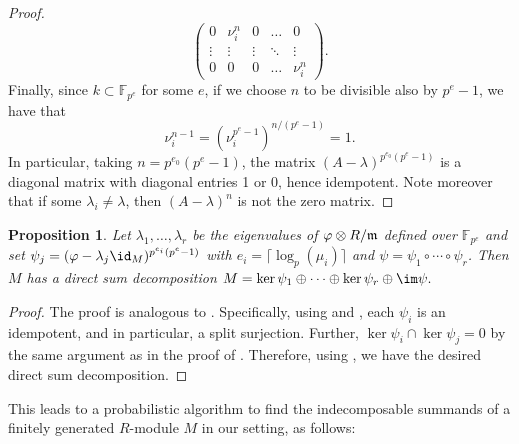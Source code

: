 \documentclass[12pt]{article}
\def\FF{\mathbb F}
\theoremstyle{theorem}
\numberwithin{thm}{section}
\newtheorem{prop}[thm]{Proposition}
\theoremstyle{definition}
\begin{document}
\begin{proof}
\[\begin{pmatrix}
    0 & \nu_i^n & 0 & \dots & 0 \\
    \vdots & \vdots & \vdots & \ddots & \vdots \\
    0 & 0 & 0 & \dots & \nu_i^n
  \end{pmatrix}. \]
  Finally, since $k\subset \FF_{p^e}$ for some $e$, if we choose $n$ to be divisible also by $p^e-1$, we have that $$\nu_i^{n-1} = (\nu_i^{p^{e}-1})^{n/(p^{e}-1)} =1.$$
  In particular, taking $n=p^{e_0}(p^e-1)$, the matrix $(A-\lambda)^{p^{e_0}(p^e-1)}$ is a diagonal matrix with diagonal entries 1 or 0, hence idempotent. Note moreover that if some $\lambda_i\neq \lambda$, then $(A-\lambda)^n$ is not the zero matrix.
\end{proof}

\begin{prop}\label{prop:split-idems}
  Let $\lambda_1,\dots,\lambda_r$ be the eigenvalues of $\varphi\otimes R/\mathfrak m$ defined over $\FF_{p^e}$ and set $\psi_j = (\phi - \lambda_j \id_M)^{p^{e_i} (p^{e} - 1)}$ with $e_i = \lceil \log_p(\mu_i) \rceil$ and $\psi = \psi_1\circ\cdots\circ\psi_r$. Then $M$ has a direct sum decomposition
  \( M = \ker\psi_1 \oplus \cdots \oplus \ker\psi_r \oplus \im\psi. \)
\end{prop}
\begin{proof}
  The proof is analogous to . Specifically, using  and , each $\psi_i$ is an idempotent, and in particular, a split surjection. Further, $\ker\psi_i\cap\ker\psi_j = 0$ by the same argument as in the proof of . Therefore, using , we have the desired direct sum decomposition.
\end{proof}

This leads to a probabilistic algorithm to find the indecomposable summands of a finitely generated $R$-module $M$ in our setting, as follows:
\end{document}
